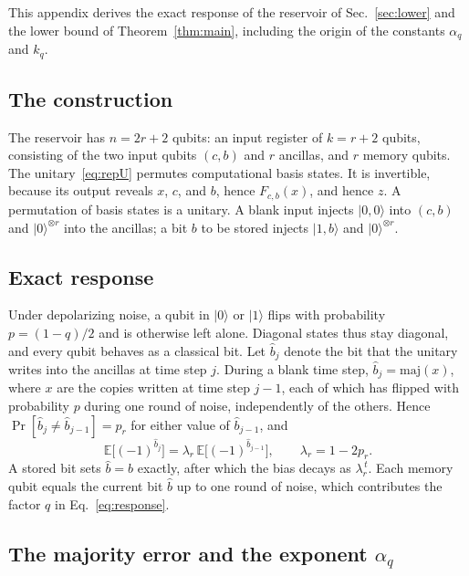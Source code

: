 \documentclass[aps,pra,reprint,superscriptaddress,floatfix]{revtex4-2}
\theoremstyle{plain}
\newcommand{\ket}[1]{|#1\rangle}
\begin{document}
This appendix derives the exact response of the reservoir of Sec.~\ref{sec:lower} and the lower bound of Theorem~\ref{thm:main}, including the origin of the constants $\alpha_q$ and $k_q$.

\subsection{The construction}

The reservoir has $n=2r+2$ qubits: an input register of $k=r+2$ qubits, consisting of the two input qubits $(c,b)$ and $r$ ancillas, and $r$ memory qubits. The unitary~\eqref{eq:repU} permutes computational basis states. It is invertible, because its output reveals $x$, $c$, and $b$, hence $F_{c,b}(x)$, and hence $z$. A permutation of basis states is a unitary. A blank input injects $\ket{0,0}$ into $(c,b)$ and $\ket0^{\otimes r}$ into the ancillas; a bit $b$ to be stored injects $\ket{1,b}$ and $\ket0^{\otimes r}$.

\subsection{Exact response}

Under depolarizing noise, a qubit in $\ket0$ or $\ket1$ flips with probability $p=(1-q)/2$ and is otherwise left alone. Diagonal states thus stay diagonal, and every qubit behaves as a classical bit. Let $\hat b_j$ denote the bit that the unitary writes into the ancillas at time step $j$. During a blank time step, $\hat b_j=\mathrm{maj}(x)$, where $x$ are the copies written at time step $j-1$, each of which has flipped with probability $p$ during one round of noise, independently of the others. Hence $\Pr[\hat b_j\ne\hat b_{j-1}]=p_r$ for either value of $\hat b_{j-1}$, and
\begin{equation}
\mathbb E\bigl[(-1)^{\hat b_j}\bigr]=\lambda_r\,\mathbb E\bigl[(-1)^{\hat b_{j-1}}\bigr],\qquad\lambda_r=1-2p_r .
\end{equation}
A stored bit sets $\hat b=b$ exactly, after which the bias decays as $\lambda_r^{\,t}$. Each memory qubit equals the current bit $\hat b$ up to one round of noise, which contributes the factor $q$ in Eq.~\eqref{eq:response}.

\subsection{The majority error and the exponent \texorpdfstring{$\alpha_q$}{alpha q}}
\end{document}
